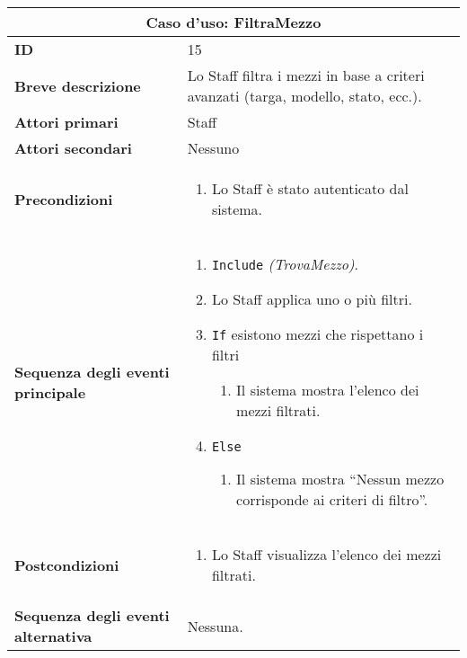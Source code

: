 \documentclass[a4paper]{report}
\begin{document}
\clearpage
\begin{table}[H]
\vspace*{-0cm}
\renewcommand{\arraystretch}{1.9}
\begin{tabular}{|p{3.9cm}|p{9.9cm}|}
\hline
\multicolumn{2}{|c|}{\textbf{Caso d’uso: FiltraMezzo}} \\ \hline
	\textbf{ID} & 15 \\ \hline
	\textbf{Breve descrizione} & Lo Staff filtra i mezzi in base a criteri avanzati (targa, modello, stato, ecc.). \\ \hline
	\textbf{Attori primari} & Staff \\ \hline
	\textbf{Attori secondari} & Nessuno \\ \hline
	\textbf{Precondizioni} & \begin{enumerate}[label=\arabic*.,leftmargin=14pt,labelsep=0.5em,topsep=0pt,partopsep=0pt,parsep=0pt,itemsep=0pt]
        \item Lo Staff è stato autenticato dal sistema.
    \end{enumerate} \\ \hline
	\textbf{Sequenza degli eventi principale} & 
\begin{enumerate}[leftmargin=14pt,label=\arabic*.,labelsep=0.5em,topsep=0pt,partopsep=0pt,parsep=0pt,itemsep=0pt]
    \item \texttt{Include} \textit{(TrovaMezzo)}.\item Lo Staff applica uno o più filtri.
    \item \texttt{If} esistono mezzi che rispettano i filtri
    \begin{enumerate}[label=\arabic{enumi}.\arabic*.,leftmargin=22pt,labelsep=0.5em,topsep=0pt,partopsep=0pt,parsep=0pt,itemsep=0pt]
        \item Il sistema mostra l’elenco dei mezzi filtrati.
    \end{enumerate}
    \item \texttt{Else}
    \begin{enumerate}[label=\arabic{enumi}.\arabic*.,leftmargin=22pt,labelsep=0.5em,topsep=0pt,partopsep=0pt,parsep=0pt,itemsep=0pt]
        \item Il sistema mostra “Nessun mezzo corrisponde ai criteri di filtro”.
    \end{enumerate}
\end{enumerate}\\ \hline
    	\textbf{Postcondizioni} & \begin{enumerate}[label=\arabic*.,leftmargin=14pt,labelsep=0.5em,topsep=0pt,partopsep=0pt,parsep=0pt,itemsep=0pt]
        \item Lo Staff visualizza l’elenco dei mezzi filtrati.
        \end{enumerate} \\ \hline
    	\textbf{Sequenza degli eventi alternativa} & Nessuna. \\ \hline
\end{tabular}
\end{table}
\end{document}
